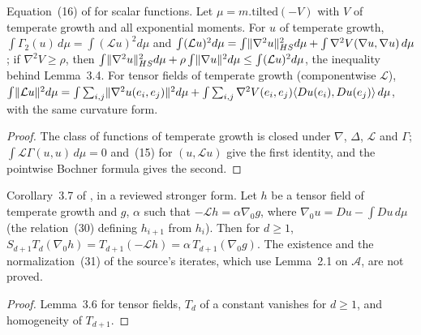 \begin{lemma}
  \label{lem:bkl-bochner-temperate}
  \leanok
  Equation~(16) of \cite{BizeulKlartagLehec2026} for scalar functions.  Let $\mu=m.\mathrm{tilted}(-V)$
  with $V$ of temperate growth and all exponential moments.  For $u$ of temperate growth,
  $\int\Gamma_2(u)\,d\mu=\int(\mathcal Lu)^2d\mu$ and
  $\int(\mathcal Lu)^2d\mu=\int\lVert\nabla^2u\rVert_{HS}^2d\mu+\int\nabla^2V(\nabla u,\nabla u)\,d\mu$; if
  $\nabla^2V\ge\rho$, then $\int\lVert\nabla^2u\rVert_{HS}^2d\mu+\rho\int\lVert\nabla u\rVert^2d\mu\le\int(\mathcal Lu)^2d\mu$,
  the inequality behind Lemma~3.4.  For tensor fields of temperate growth (componentwise $\mathcal L$),
  $\int\lVert\mathcal Lu\rVert^2d\mu=\int\sum_{i,j}\lVert\nabla^2u(e_i,e_j)\rVert^2d\mu
  +\int\sum_{i,j}\nabla^2V(e_i,e_j)\langle Du(e_i),Du(e_j)\rangle\,d\mu$, with the same curvature form.
\end{lemma}
\begin{proof}
  \leanok
  The class of functions of temperate growth is closed under $\nabla$, $\Delta$, $\mathcal L$ and
  $\Gamma$; $\int\mathcal L\Gamma(u,u)\,d\mu=0$ and~(15) for $(u,\mathcal Lu)$ give the first identity,
  and the pointwise Bochner formula gives the second.
\end{proof}

\begin{corollary}
  \label{lem:bkl-corollary-3-7}
  \leanok
  Corollary~3.7 of \cite{BizeulKlartagLehec2026}, in a reviewed stronger form.  Let $h$ be a tensor
  field of temperate growth and $g$, $\alpha$ such that $-\mathcal Lh=\alpha\nabla_0g$, where
  $\nabla_0u=Du-\int Du\,d\mu$ (the relation~(30) defining $h_{i+1}$ from $h_i$).  Then for $d\ge1$,
  $S_{d+1}T_d(\nabla_0h)=T_{d+1}(-\mathcal Lh)=\alpha\,T_{d+1}(\nabla_0g)$.  The existence and the
  normalization~(31) of the source's iterates, which use Lemma~2.1 on $\mathcal A$, are not proved.
\end{corollary}
\begin{proof}
  \leanok
  Lemma~3.6 for tensor fields, $T_d$ of a constant vanishes for $d\ge1$, and homogeneity of $T_{d+1}$.
\end{proof}

